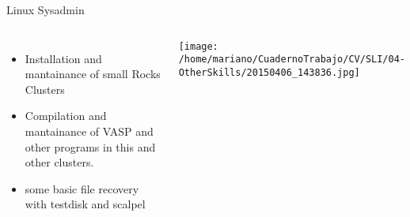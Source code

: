\begin{frame}{Linux Sysadmin}

\begin{columns}

\begin{itemize}
\item Installation and mantainance of {\tiny small} Rocks Clusters
\item Compilation and mantainance of VASP and other 
programs in this and other clusters. 
\item some basic file recovery with testdisk and scalpel
\end{itemize}
\texttt{[image: /home/mariano/CuadernoTrabajo/CV/SLI/04-OtherSkills/20150406\_143836.jpg]}


\end{columns}

\end{frame}
